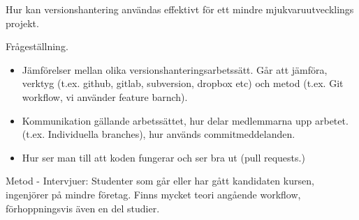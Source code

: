 Hur kan versionshantering användas effektivt för ett mindre mjukvaruutvecklings projekt.

\vspace{1.5em}
Frågeställning.
\begin{itemize}
    \item Jämförelser mellan olika versionshanteringsarbetssätt. Går att jämföra, verktyg (t.ex. github, gitlab, subversion, dropbox etc) och metod (t.ex. Git workflow, vi använder feature barnch).
    \item Kommunikation gällande arbetssättet, hur delar medlemmarna upp arbetet. (t.ex. Individuella branches), hur används commitmeddelanden.
    \item Hur ser man till att koden fungerar och ser bra ut (pull requests.)
\end{itemize}

\vspace{1.5em}
Metod - Intervjuer:  Studenter som går eller har gått kandidaten kursen, ingenjörer på mindre företag. Finns mycket teori angående workflow, förhoppningsvis även en del studier.
